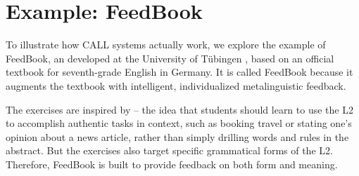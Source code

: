 








\section{Example: FeedBook}

To illustrate how CALL systems actually work, we explore the example of FeedBook, an  developed at the University of T\"ubingen \citep{Rudzewitz-etal:2017,Meurers-etal:2019}, based on an official textbook for seventh-grade English in Germany.  It is called FeedBook because it augments the textbook with intelligent, individualized metalinguistic feedback.  

The exercises are inspired by  -- the idea that students should learn to use the L2 to accomplish authentic tasks in context, such as booking travel or stating one's opinion about a news article, rather than simply drilling words and rules in the abstract.  But the exercises also target specific grammatical forms of the L2.  Therefore, FeedBook is built to provide feedback on both form and meaning.

